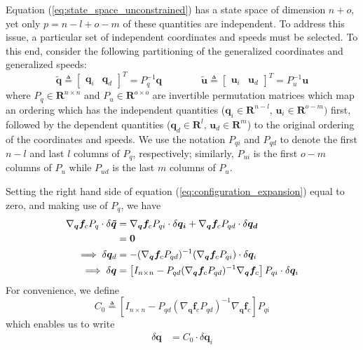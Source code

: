 \documentclass{svjour3}                     %
\begin{document}
Equation (\ref{eq:state_space_unconstrained}) has a state space of dimension $n
+ o$, yet only $p = n - l + o - m$ of these quantities are independent.
To address this issue, a particular set of independent
coordinates and speeds must be selected. To this end, consider the following
partitioning of the generalized coordinates and generalized speeds:
\begin{equation*}
  \tilde{\bm{q}} \triangleq \left[\begin{array}{cc}\bm{q}_{i} &
      \bm{q}_{d}\end{array}\right]^{T} =  P_{q}^{-1} \bm{q}
      \qquad\qquad
  \tilde{\bm{u}} \triangleq \left[\begin{array}{cc}\bm{u}_{i} &
      \bm{u}_{d}\end{array}\right]^{T} =  P_{u}^{-1} \bm{u}
\end{equation*}
where $P_q \in \mathbf{R}^{n \times n}$ and $P_u \in \mathbf{R}^{o \times o}$
are invertible permutation matrices which map an ordering which has the
independent quantities ($\bm{q}_{i}\in\mathbf{R}^{n-l},\,
\bm{u}_{i}\in\mathbf{R}^{o-m})$ first, followed by the dependent quantities
($\bm{q}_{d}\in\mathbf{R}^{l},\, \bm{u}_{d}\in\mathbf{R}^{m}$) to the
original ordering of the coordinates and speeds.  We use the notation $P_{qi}$
and $P_{qd}$ to denote the first $n-l$ and last $l$ columns of $P_q$,
respectively; similarly, $P_{ui}$ is the first $o-m$ columns of $P_{u}$ while
$P_{ud}$ is the last $m$ columns of $P_u$.

Setting the right hand side of equation (\ref{eq:configuration_expansion}) equal to
zero, and making use of $P_q$, we have
\begin{align}
  \nabla_{\bm{q}}\bm{f}_{c} P_{q} \cdot \delta \bm{\tilde{q}} &=
  \nabla_{\bm{q}}\bm{f}_{c} P_{qi} \cdot \delta \bm{q_i} +
  \nabla_{\bm{q}}\bm{f}_{c} P_{qd} \cdot \delta \bm{q_d}\notag\\
  &= \bm{0}\notag\\
  \implies \delta \bm{q}_d &= -(\nabla_{\bm{q}}\bm{f}_{c} P_{qd})^{-1}
  (\nabla_{\bm{q}}\bm{f}_{c} P_{qi}) \cdot \delta \bm{q}_i \notag\\
  \implies \delta \bm{q} &= \left[ I_{n \times n} - P_{qd}(\nabla_{\bm{q}}
    \bm{f}_{c} P_{qd})^{-1} \nabla_{\bm{q}} \bm{f}_{c} \right] P_{qi} \cdot \delta
    \bm{q}_i
\end{align}
For convenience, we define
\begin{equation}
  \label{eq:C_0}
  C_0 \triangleq \left[ I_{n \times n} - P_{qd}(\nabla_{\bm{q}}
    \bm{f}_{c} P_{qd})^{-1} \nabla_{\bm{q}} \bm{f}_{c} \right] P_{qi}
\end{equation}
which enables us to write
\begin{align}
  \label{eq:delta_q}
  \delta \bm{q} &= C_0 \cdot \delta \bm{q}_i
\end{align}
\end{document}
